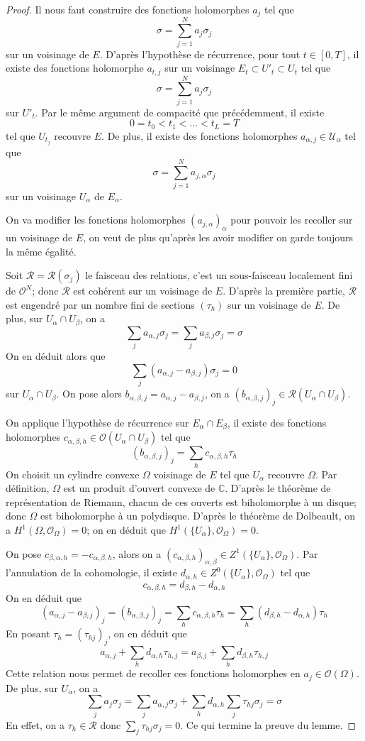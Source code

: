 \documentclass{article}
\theoremstyle{definition}
\theoremstyle{remark}
\begin{document}
\begin{proof}
Il nous faut construire des fonctions holomorphes $a_j$ tel que 
$$\sigma = \sum_{j=1}^N a_j\sigma_j$$ sur un voisinage de $E$. D'après l'hypothèse de récurrence, pour tout $t \in [0, T]$, il existe des fonctions holomorphe $a_{t,j}$ sur un voisinage $E_t \subset U'_t \subset U_t$ tel que
$$\sigma = \sum_{j=1}^N a_j\sigma_j$$
sur $U'_t$. Par le même argument de compacité que précédemment, il existe $$0 = t_0 < t_1 < ... < t_L = T$$ tel que ${U_{t_j}}$ recouvre $E$. De plus, il existe des fonctions holomorphes $a_{\alpha,j} \in \mathcal{U_\alpha}$ tel que $$\sigma = \sum_{j=1}^N a_{j, \alpha}\sigma_j$$ sur un voisinage $U_\alpha$ de $E_\alpha$.

On va modifier les fonctions holomorphes $(a_{j, \alpha})_\alpha$ pour pouvoir les recoller sur un voisinage de $E$, on veut de plus qu'après les avoir modifier on garde toujours la même égalité.

Soit $\mathcal{R} = \mathcal{R}(\sigma_j)$ le faisceau des relations, c'est un sous-faisceau localement fini de $\mathcal{O}^N$; donc $\mathcal{R}$ est cohérent sur un voisinage de $E$. D'après la première partie, $\mathcal{R}$ est engendré par un nombre fini de sections $(\tau_h)$ sur un voisinage de $E$. De plus, sur $U_\alpha \cap U_\beta$, on a $$\sum_j a_{\alpha,j}\sigma_j =\sum_j a_{\beta,j}\sigma_j = \sigma$$
On en déduit alors que
$$\sum_j (a_{\alpha,j} - a_{\beta,j})\sigma_j = 0$$ sur $U_\alpha \cap U_\beta$. On pose alors $b_{\alpha, \beta, j} = a_{\alpha,j} - a_{\beta,j}$, on a $(b_{\alpha, \beta, j})_j \in \mathcal{R}(U_\alpha \cap U_\beta)$.

On applique l'hypothèse de récurrence sur $E_\alpha \cap E_\beta$, il existe des fonctions holomorphes $c_{\alpha,\beta,h} \in \mathcal{O}(U_\alpha \cap U_\beta)$ tel que
$$(b_{\alpha,\beta,j})_j = \sum_h c_{\alpha,\beta,h}\tau_h$$
On choisit un cylindre convexe $\Omega$ voisinage de $E$ tel que ${U_\alpha}$ recouvre $\Omega$. Par définition, $\Omega$ est un produit d'ouvert convexe de $\mathbb{C}$. D'après le théorème de représentation de Riemann, chacun de ces ouverts est biholomorphe à un disque; donc $\Omega$ est biholomorphe à un polydisque. D'après le théorème de Dolbeault, on a $H^1(\Omega, \mathcal{O}_\Omega)=0$; on en déduit que $H^1(\{U_\alpha\}, \mathcal{O}_\Omega)=0$.

On pose $c_{\beta, \alpha, h} = - c_{\alpha, \beta, h}$, alors on a $(c_{\alpha,\beta,h})_{\alpha,\beta} \in Z^1(\{U_\alpha\}, \mathcal{O}_\Omega)$. Par l'annulation de la cohomologie, il existe $d_{\alpha, h} \in Z^0(\{U_\alpha\}, \mathcal{O}_\Omega)$ tel que $$c_{\alpha, \beta, h} = d_{\beta, h} - d_{\alpha, h}$$
On en déduit que $$(a_{\alpha,j} - a_{\beta,j})_j = (b_{\alpha,\beta,j})_j = \sum_h c_{\alpha,\beta,h}\tau_h = \sum_h (d_{\beta, h} - d_{\alpha,h})\tau_h$$
En posant $\tau_h = (\tau_{hj})_j$, on en déduit que
$$a_{\alpha,j} + \sum_h d_{\alpha,h}\tau_{h, j} = a_{\beta,j} + \sum_h d_{\beta,h}\tau_{h, j}$$
Cette relation nous permet de recoller ces fonctions holomorphes en $a_j \in \mathcal{O}(\Omega)$. De plus, sur $U_\alpha$, on a
$$\sum_j a_j\sigma_j = \sum_j a_{\alpha,j}\sigma_j + \sum_h d_{\alpha,h}\sum_j \tau_{hj}\sigma_j = \sigma$$
En effet, on a $\tau_h \in \mathcal{R}$ donc $\sum_j \tau_{hj}\sigma_j = 0$. Ce qui termine la preuve du lemme.
\end{proof}
\end{document}
